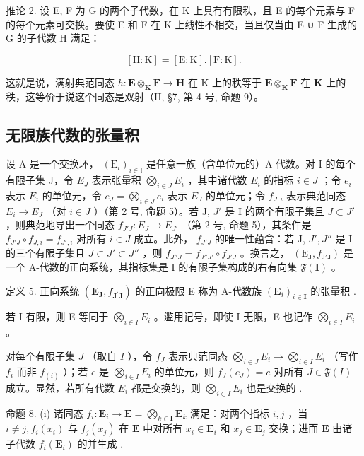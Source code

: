 推论 2. 设 E, F 为 G 的两个子代数，在 K 上具有有限秩，且 E 的每个元素与 F 的每个元素可交换。要使 E 和 F 在 K 上线性不相交，当且仅当由 E ∪ F 生成的 G 的子代数 H 满足：

\[
[ \mathrm{H}: \mathrm{K} ] = [ \mathrm{E}: \mathrm{K} ]. [ \mathrm{F}: \mathrm{K} ].\tag{12}
\]

这就是说，满射典范同态 \(h: \mathbf{E} \otimes_{\mathbf{K}} \mathbf{F} \to \mathbf{H}\) 在 K 上的秩等于 \(\mathbf{E} \otimes_{\mathbf{K}} \mathbf{F}\) 在 \(\mathbf{K}\) 上的秩，这等价于说这个同态是双射（II, §7, 第 4 号, 命题 9）。

\subsection{无限族代数的张量积}

设 A 是一个交换环， \((\mathrm{E}_{i})_{i\in\mathbb{I}}\) 是任意一族（含单位元的）A-代数。对 I 的每个有限子集 J，令 \(E_{J}\) 表示张量积 \(\bigotimes_{i\in J}E_{i}\) ，其中诸代数 \(E_{i}\) 的指标 \(i\in J\) ；令 \(e_{i}\) 表示 \(E_{i}\) 的单位元，令 \(e_{J}=\bigotimes_{i\in J}e_{i}\) 表示 \(E_{J}\) 的单位元；令 \(f_{J,i}\) 表示典范同态 \(E_{i}\to E_{J}\) （对 \(i\in J\) ）（第 2 号, 命题 5）。若 J, \(J'\) 是 I 的两个有限子集且 \(J\subset J'\) ，则典范地导出一个同态 \(f_{J'J}:E_{J}\to E_{J'}\) （第 2 号, 命题 5），其条件是 \(f_{J'J}\circ f_{J,i}=f_{J',i}\) 对所有 \(i\in J\) 成立。此外， \(f_{J'J}\) 的唯一性蕴含：若 J, \(J',J''\) 是 I 的三个有限子集且 \(J\subset J'\subset J''\) ，则 \(f_{J''J}=f_{J''J'}\circ f_{J'J}\) 。换言之， \((\mathrm{E}_{\mathrm{J}},f_{\mathrm{J}'\mathrm{J}})\) 是一个 A-代数的正向系统，其指标集是 I 的有限子集构成的右有向集 \(\mathfrak{F}(\mathbf{I})\) 。

定义 5. 正向系统 \((\mathbf{E}_{\mathbf{J}}, f_{\mathbf{J}^{\prime}\mathbf{J}})\) 的正向极限 E 称为 A-代数族 \((\mathbf{E}_i)_{i \in \mathbf{I}}\) 的张量积 .

若 I 有限，则 E 等同于 \(\bigotimes_{i\in I}E_i\) 。滥用记号，即使 I 无限，E 也记作 \(\bigotimes_{i\in I}E_i\) 。

对每个有限子集 \(J\) （取自 \(I\) ），令 \(f_{J}\) 表示典范同态 \(\bigotimes_{i \in J} E_{i} \to \bigotimes_{i \in I} E_{i}\) （写作 \(f_{i}\) 而非 \(f_{(i)}\) ）；若 \(e\) 是 \(\bigotimes_{i \in I} E_{i}\) 的单位元，则 \(f_{J}(e_{J}) = e\) 对所有 \(J \in \mathfrak{F}(I)\) 成立。显然，若所有代数 \(E_{i}\) 都是交换的，则 \(\bigotimes_{i \in I} E_{i}\) 也是交换的 .

命题 8. (i) 诸同态 \(f_{i} \colon \mathbf{E}_{i} \to \mathbf{E} = \bigotimes_{k \in \mathbf{I}} \mathbf{E}_{k}\) 满足：对两个指标 \(i, j\) ，当 \(i \neq j, f_{i}(x_{i})\) 与 \(f_{j}(x_{j})\) 在 \(\mathbf{E}\) 中对所有 \(x_{i} \in \mathbf{E}_{i}\) 和 \(x_{j} \in \mathbf{E}_{j}\) 交换；进而 \(\mathbf{E}\) 由诸子代数 \(f_{i}(\mathbf{E}_{i})\) 的并生成 .

